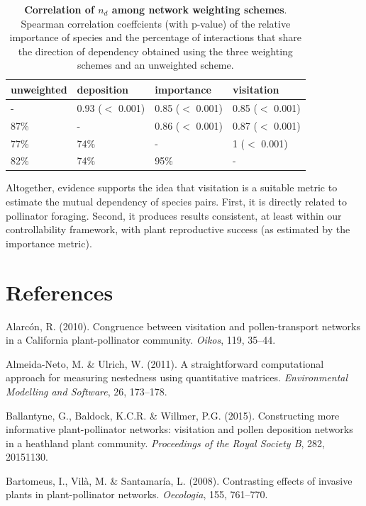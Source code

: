 \documentclass[a4paper]{artikel1}
\begin{document}
\begin{table}[ht]
\centering
\begin{tabular}{llll}
  \hline
unweighted & deposition & importance & visitation \\ 
  \hline
- & 0.93 ($<$ 0.001) & 0.85 ($<$ 0.001) & 0.85 ($<$ 0.001) \\ 
  87\% & - & 0.86 ($<$ 0.001) & 0.87 ($<$ 0.001) \\ 
  77\% & 74\% & - & 1 ($<$ 0.001) \\ 
  82\% & 74\% & 95\% & - \\ 
   \hline
\end{tabular}
\caption{\textbf{Correlation of $n_d$ among network weighting schemes}. Spearman correlation coeffcients (with p-value) of the relative importance of species and the percentage of interactions that share the direction of dependency obtained using the three weighting schemes and an unweighted scheme.} 
\end{table}

Altogether, evidence supports the idea that visitation is a suitable
metric to estimate the mutual dependency of species pairs. First, it is
directly related to pollinator foraging. Second, it produces results
consistent, at least within our controllability framework, with plant
reproductive success (as estimated by the importance metric).

\section*{References}\label{references}

\hypertarget{refs}{}
\hypertarget{ref-Alarcon2010}{}
Alarcón, R. (2010). Congruence between visitation and pollen-transport
networks in a California plant-pollinator community. \emph{Oikos}, 119,
35--44.

\hypertarget{ref-Almeida-Neto2011}{}
Almeida-Neto, M. \& Ulrich, W. (2011). A straightforward computational
approach for measuring nestedness using quantitative matrices.
\emph{Environmental Modelling and Software}, 26, 173--178.

\hypertarget{ref-Ballantyne2015}{}
Ballantyne, G., Baldock, K.C.R. \& Willmer, P.G. (2015). Constructing
more informative plant-pollinator networks: visitation and pollen
deposition networks in a heathland plant community. \emph{Proceedings of
the Royal Society B}, 282, 20151130.

\hypertarget{ref-Bartomeus2008}{}
Bartomeus, I., Vilà, M. \& Santamaría, L. (2008). Contrasting effects of
invasive plants in plant-pollinator networks. \emph{Oecologia}, 155,
761--770.
\end{document}
